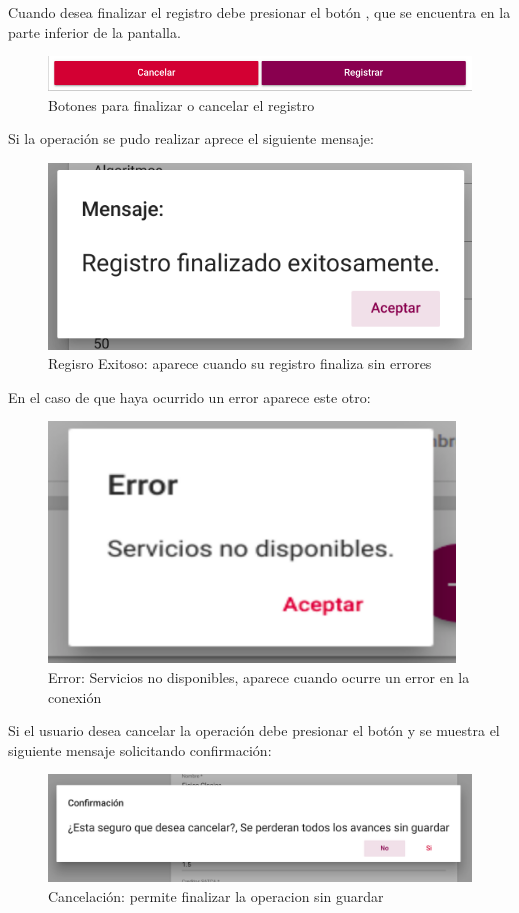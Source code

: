 Cuando desea finalizar el registro debe presionar el botón , que se encuentra en la parte inferior de la pantalla.\\
\begin{figure}[H]
    \centering
    \hypertarget{registrarBtnR}{\includegraphics[width=0.7\linewidth]{images/GUA/registrarBtn}}
    \caption{Botones para finalizar o cancelar el registro}
    \label{registrarBtnR}
\end{figure}
Si la operación se pudo realizar aprece el siguiente mensaje:\\
\begin{figure}[H]
    \centering
    \hypertarget{exito}{\includegraphics[width=0.7\linewidth]{images/GUA/exito}}
    \caption{Regisro Exitoso: aparece cuando su registro finaliza sin errores}
    \label{exito}
\end{figure}
En el caso de que haya ocurrido un error aparece este otro:\\
\begin{figure}[H]
    \centering
    \hypertarget{errorR}{\includegraphics[width=0.7\linewidth]{images/GUA/error}}
    \caption{Error: Servicios no disponibles, aparece cuando ocurre un error en la conexión}
    \label{errorR}
\end{figure}
Si el usuario desea cancelar la operación debe presionar el botón  y se muestra el siguiente mensaje solicitando confirmación:\\
\begin{figure}[H]
    \centering
    \hypertarget{cancelarR}{\includegraphics[width=0.7\linewidth]{images/GUA/cancelar}}
    \caption{Cancelación: permite finalizar la operacion sin guardar}
    \label{cancelarR}
\end{figure}
\newpage
